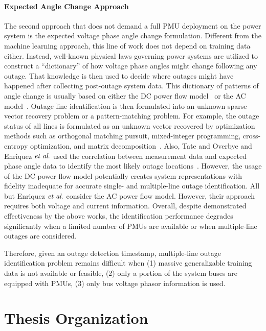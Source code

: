 \paragraph{Expected Angle Change Approach}
The second approach that does not demand a full PMU deployment on the power system is the expected voltage phase angle change formulation. Different from the machine learning approach, this line of work does not depend on training data either. Instead, well-known physical laws governing power systems are utilized to construct a ``dictionary'' of how voltage phase angles might change following any outage. That knowledge is then used to decide where outages might have happened after collecting post-outage system data. This dictionary of patterns of angle change is usually based on either the DC power flow model~\cite{Tate2008,tate2009double,Zhu2012,Emami2013,Chen2014,Wu2015} or the AC model~\cite{Costilla-Enriquez2019}. Outage line identification is then formulated into an unknown sparse vector recovery problem or a pattern-matching problem. For example, the outage status of all lines is formulated as an unknown vector recovered by optimization methods such as orthogonal matching pursuit, mixed-integer programming, cross-entropy optimization, and matrix decomposition~\cite{Zhu2012, Emami2013,Chen2014,Wu2015}. Also, Tate and Overbye and Enriquez $\textit{et al}.$ used the correlation between measurement data and expected phase angle data to identify the most likely outage locations~\cite{Tate2008,Costilla-Enriquez2019}. 
However, the usage of the DC power flow model potentially creates system representations with fidelity inadequate for accurate single- and multiple-line outage identification. All but Enriquez $\textit{et al}.$ consider the AC power flow model. However, their approach requires both voltage and current information. Overall, despite demonstrated effectiveness by the above works, the identification performance degrades significantly when a limited number of PMUs are available or when multiple-line outages are considered. 


Therefore, given an outage detection timestamp, multiple-line outage identification problem remains difficult when (1) massive generalizable training data is not available or feasible, (2) only a portion of the system buses are equipped with PMUs, (3) only bus voltage phasor information is used.  


\section{Thesis Organization}

